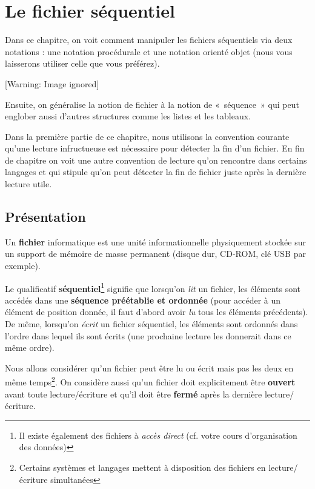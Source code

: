 \chapter[Le fichier séquentiel]{
Le fichier séquentiel}
{
Dans ce chapitre, on voit comment manipuler les fichiers séquentiels via
deux notations : une notation procédurale et une notation orienté objet
(nous vous laisserons utiliser celle que vous préférez). }

\begin{center}
 [Warning: Image ignored] %

\end{center}
{
Ensuite, on généralise la notion de fichier à la notion de «~séquence~»
qui peut englober aussi d'autres structures comme les
listes et les tableaux.}

{
Dans la première partie de ce chapitre, nous utilisons la convention
courante qu'une lecture infructueuse est nécessaire
pour détecter la fin d'un fichier. En fin de chapitre
on voit une autre convention de lecture qu'on
rencontre dans certains langages et qui stipule qu'on
peut détecter la fin de fichier juste après la dernière lecture utile.
}

\section{Présentation}
{
Un \textbf{fichier} informatique est une unité informationnelle
physiquement stockée sur un support de mémoire de masse permanent
(disque dur, CD-ROM, clé USB par exemple). }

{
Le qualificatif \textbf{séquentiel}\footnote{Il existe également des
fichiers à \textit{accès direct} (cf. votre cours
d'organisation des données)} signifie que
lorsqu'on \textit{lit} un fichier, les éléments sont
accédés dans une \textbf{séquence préétablie et ordonnée} (pour accéder
à un élément de position donnée, il faut d’abord avoir \textit{lu} tous
les éléments précédents). De même, lorsqu'on
\textit{écrit} un fichier séquentiel, les éléments sont ordonnés dans
l'ordre dans lequel ils sont écrits (une prochaine
lecture les donnerait dans ce même ordre).}

{
Nous allons considérer qu'un fichier peut être lu ou
écrit mais pas les deux en même temps\footnote{Certains systèmes et
langages mettent à disposition des fichiers en lecture/écriture
simultanées}. On considère aussi qu'un fichier doit
explicitement être \textbf{ouvert} avant toute lecture/écriture et
qu'il doit être \textbf{fermé} après la dernière
lecture/écriture.}

